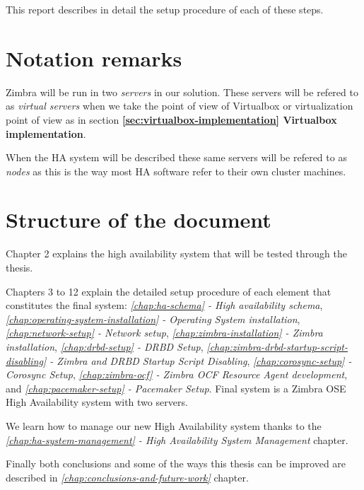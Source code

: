 This report describes in detail the setup procedure of each of these steps.

\section {Notation remarks}
Zimbra will be run in two \textit{servers} in our solution. These servers will be refered to as \textit{virtual servers} when we take the point of view of Virtualbox or virtualization point of view as in section \textbf {\ref{sec:virtualbox-implementation} Virtualbox implementation}.

When the HA system will be described these same servers will be refered to as \textit{nodes} as this is the way most HA software refer to their own cluster machines.

\section {Structure of the document}

Chapter 2 explains the high availability system that will be tested through the thesis.

Chapters 3 to 12 explain the detailed setup procedure of each element that constitutes the final system: \textit{\ref{chap:ha-schema} - High availability schema},
\textit{\ref{chap:operating-system-installation} - Operating System installation},
\textit{\ref{chap:network-setup} - Network setup},
\textit{\ref{chap:zimbra-installation} - Zimbra installation},
\textit{\ref{chap:drbd-setup} - DRBD Setup},
\textit{\ref{chap:zimbra-drbd-startup-script-disabling} - Zimbra and DRBD Startup Script Disabling},
\textit{\ref{chap:corosync-setup} - Corosync Setup},
\textit{\ref{chap:zimbra-ocf} - Zimbra OCF Resource Agent development},
and
\textit{\ref{chap:pacemaker-setup} - Pacemaker Setup}.
Final system is a Zimbra OSE High Availability system with two servers.

We learn how to manage our new High Availability system thanks to the \textit{\ref{chap:ha-system-management} - High Availability System Management} chapter.

Finally both conclusions and some of the ways this thesis can be improved are described in \textit{\ref{chap:conclusions-and-future-work}} chapter.

